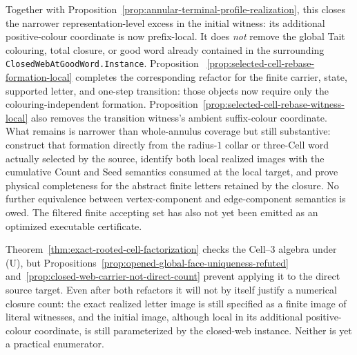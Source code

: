 Together with Proposition~\ref{prop:annular-terminal-profile-realization}, this
closes the narrower representation-level excess in the initial witness: its
additional positive-colour coordinate is now prefix-local.  It does \emph{not}
remove the global Tait colouring, total closure, or good word already contained
in the surrounding \texttt{ClosedWebAtGoodWord.Instance}.  Proposition~
\ref{prop:selected-cell-rebase-formation-local} completes the corresponding
refactor for the finite carrier, state, supported letter, and one-step
transition: those objects now require only the colouring-independent
formation.  Proposition~\ref{prop:selected-cell-rebase-witness-local} also
removes the transition witness's ambient suffix-colour coordinate.  What
remains is narrower than whole-annulus coverage but still substantive:
construct that formation directly from the radius-$1$ collar or three-Cell
word actually selected by the source, identify both local realized images with
the cumulative Count and Seed semantics consumed at the local target, and
prove physical completeness for the abstract finite letters retained by the
closure.  No further equivalence between vertex-component and edge-component
semantics is owed.  The filtered finite accepting set has also not yet been
emitted as an optimized executable certificate.

Theorem~\ref{thm:exact-rooted-cell-factorization} checks the Cell--3 algebra
under (U), but Propositions~\ref{prop:opened-global-face-uniqueness-refuted}
and~\ref{prop:closed-web-carrier-not-direct-count} prevent applying it to the
direct source target.  Even after both refactors it will not by itself justify
a numerical closure count: the exact realized letter image is still specified
as a finite image of literal witnesses, and the initial image, although local
in its additional positive-colour coordinate, is still parameterized by the
closed-web instance.  Neither is yet a practical enumerator.

